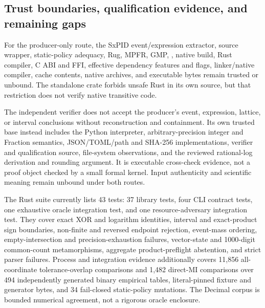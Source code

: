 \documentclass[11pt]{article}
\begin{document}
\subsection{Trust boundaries, qualification evidence, and remaining gaps}

For the producer-only route, the SxPID event/expression extractor, source wrapper, static-policy
adequacy, Rug, MPFR, GMP, , native build, Rust compiler, C ABI and FFI, effective
dependency features and flags, linker/native compiler, cache contents, native archives, and
executable bytes remain trusted or unbound.  The standalone crate forbids unsafe Rust in its own
source, but that restriction does not verify native transitive code.

The independent verifier does not accept the producer's event, expression, lattice, or interval
conclusions without reconstruction and containment.  Its own trusted base instead includes the
Python interpreter, arbitrary-precision integer and Fraction semantics, JSON/TOML/path and SHA-256
implementations, verifier and qualification source, file-system observations, and the reviewed
rational-log derivation and rounding argument.  It is executable cross-check evidence, not a proof
object checked by a small formal kernel.  Input authenticity and scientific meaning remain
unbound under both routes.

The Rust suite currently lists 43 tests: 37 library tests, four CLI contract tests, one exhaustive
oracle integration test, and one resource-adversary integration test.  They cover exact XOR and
logarithm identities, interval and exact-product sign boundaries, non-finite and reversed endpoint
rejection, event-mass ordering, empty-intersection and precision-exhaustion failures, vector-state
and 1000-digit common-count metamorphisms, aggregate product-preflight abstention, and strict parser
failures.  Process and integration evidence additionally covers 11,856 all-coordinate
tolerance-overlap comparisons and 1,482 direct-MI comparisons over 494 independently generated
binary empirical tables, literal-pinned fixture and generator bytes, and 34 fail-closed
static-policy mutations.  The Decimal corpus is bounded numerical agreement, not a rigorous oracle
enclosure.
\end{document}
